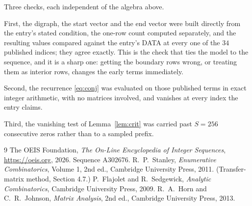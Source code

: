 \documentclass[11pt,a4paper]{article}
\theoremstyle{plain}
\theoremstyle{definition}
\begin{document}
Three checks, each independent of the algebra above.

First, the digraph, the start vector and the end vector were built directly from the
entry's stated condition, the one-row count computed separately, and the resulting values
compared against the entry's DATA at every one of the $34$ published indices; they
agree exactly. This is the check that ties the model to the sequence, and it is a sharp one:
getting the boundary rows wrong, or treating them as interior rows, changes the early terms
immediately.

Second, the recurrence \eqref{eq:conj} was evaluated on those published terms in exact
integer arithmetic, with no matrices involved, and vanishes at every index the entry claims.

Third, the vanishing test of Lemma~\ref{lem:crit} was carried past $S=256$ consecutive
zeros rather than to a sampled prefix.

\begin{thebibliography}{9}
 The OEIS Foundation, \emph{The On-Line Encyclopedia of Integer
Sequences}, \url{https://oeis.org}, 2026. Sequence A302676.
 R.~P.~Stanley, \emph{Enumerative Combinatorics}, Volume 1, 2nd ed.,
Cambridge University Press, 2011. (Transfer-matrix method, Section 4.7.)
 P.~Flajolet and R.~Sedgewick, \emph{Analytic Combinatorics}, Cambridge
University Press, 2009.
 R.~A.~Horn and C.~R.~Johnson, \emph{Matrix Analysis}, 2nd ed., Cambridge
University Press, 2013.
\end{thebibliography}
\end{document}
